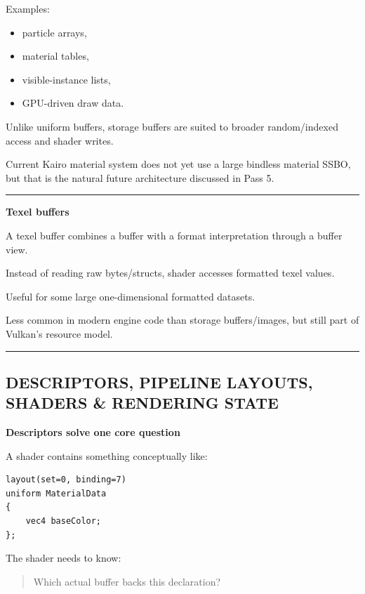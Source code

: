 Examples:

\begin{itemize}
\tightlist
\item
  particle arrays,
\item
  material tables,
\item
  visible-instance lists,
\item
  GPU-driven draw data.
\end{itemize}

Unlike uniform buffers, storage buffers are suited to broader random/indexed access and shader writes.

Current Kairo material system does not yet use a large bindless material SSBO, but that is the natural future architecture discussed in Pass 5.

\begin{center}\rule{0.5\linewidth}{0.5pt}\end{center}

\textbf{Texel buffers}

A texel buffer combines a buffer with a format interpretation through a buffer view.

Instead of reading raw bytes/structs, shader accesses formatted texel values.

Useful for some large one-dimensional formatted datasets.

Less common in modern engine code than storage buffers/images, but still part of Vulkan's resource model.

\begin{center}\rule{0.5\linewidth}{0.5pt}\end{center}

\subsection{DESCRIPTORS, PIPELINE LAYOUTS, SHADERS \& RENDERING STATE}\label{05-engine-i-ch021-descriptors-pipeline-layouts-shaders-rendering-state}

\textbf{Descriptors solve one core question}

A shader contains something conceptually like:

\begin{verbatim}
layout(set=0, binding=7)
uniform MaterialData
{
    vec4 baseColor;
};
\end{verbatim}

The shader needs to know:

\begin{quote}
Which actual buffer backs this declaration?
\end{quote}

